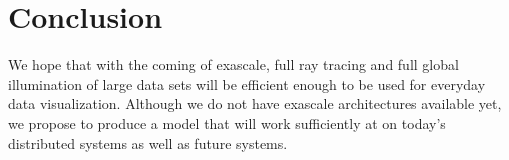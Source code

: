 \documentclass[12pt]{article}
\begin{document}
\section*{Conclusion}

We hope that with the coming of exascale, full ray tracing and full global illumination of large data sets will be efficient enough to be used for everyday data visualization.  Although we do not have exascale architectures available yet, we propose to produce a model that will work sufficiently at on today's distributed systems as well as future systems.
\end{document}
